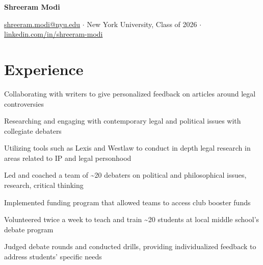 \documentclass[letterpaper]{resume-shreeram}
\begin{document}
\begin{center}
  {\Huge \bfseries Shreeram Modi}

  \href{mailto:shreeram.modi@nyu.edu}{shreeram.modi@nyu.edu}
  $\cdot$
  New York University, Class of 2026
  $\cdot$
  \href{https://linkedin.com/in/shreeram-modi}{linkedin.com/in/shreeram-modi}
\end{center}

\section{Experience}

\begin{compactitem}
  \item Collaborating with writers to give personalized feedback on
    articles around legal controversies
\end{compactitem}

\begin{compactitem}
  \item Researching and engaging with contemporary legal and political
    issues with collegiate debaters

  \item Utilizing tools such as Lexis and Westlaw to conduct in depth
    legal research in areas related to IP and legal personhood
\end{compactitem}

\begin{compactitem}
    \item Led and coached a team of \textasciitilde{}20 debaters on
      political and philosophical issues, research, critical thinking

    \item Implemented funding program that allowed teams to access club booster
      funds
\end{compactitem}

\begin{compactitem}
    \item Volunteered twice a week to teach and train \textasciitilde{}20
      students at local middle school's debate program

    \item Judged debate rounds and conducted drills, providing
      individualized feedback to address students' specific needs
\end{compactitem}
\end{document}

